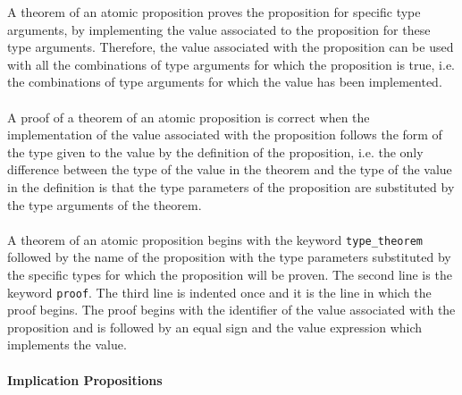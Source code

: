 \documentclass{article}
\begin{document}
\begin{itemize}
A theorem of an atomic proposition proves the proposition for
specific type arguments, by implementing the value associated to the
proposition for these type arguments. Therefore, the value associated with the
proposition can be used with all the combinations of type arguments for which
the proposition is true, i.e. the combinations of type arguments for which
the value has been implemented.
\\\\
A proof of a theorem of an atomic proposition is correct when the
implementation of the value associated with the proposition follows the form of
the type given to the value by the definition of the proposition, i.e. the only
difference between the type of the value in the theorem and the type of the
value in the definition is that the type parameters of the proposition are
substituted by the type arguments of the theorem.
\\\\
A theorem of an atomic proposition begins with the keyword
\texttt{type_theorem} followed by the name of the proposition with the type
parameters substituted by the specific types for which the proposition will be
proven. The second line is the keyword \texttt{proof}. The third line is
indented once and it is the line in which the proof begins. The proof begins
with the identifier of the value associated with the proposition and is followed
by an equal sign and the value expression which implements the value.

\end{itemize}

\paragraph{Implication Propositions}
\end{document}
